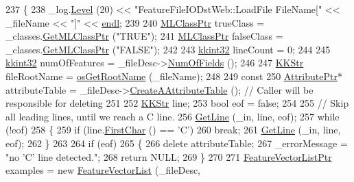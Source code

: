 \begin{DoxyCode}
237 \{
238   \_log.\hyperlink{class_k_k_b_1_1_run_log_a32cf761d7f2e747465fd80533fdbb659}{Level} (20) << \textcolor{stringliteral}{"FeatureFileIODstWeb::LoadFile   FileName["} << \_fileName << \textcolor{stringliteral}{"]"} << 
      \hyperlink{namespace_k_k_b_ad1f50f65af6adc8fa9e6f62d007818a8}{endl};
239 
240   \hyperlink{class_k_k_m_l_l_1_1_m_l_class}{MLClassPtr}  trueClass  = \_classes.\hyperlink{class_k_k_m_l_l_1_1_m_l_class_list_ab751a744d6e0d8937ca64b9cdde1488b}{GetMLClassPtr} (\textcolor{stringliteral}{"TRUE"});
241   \hyperlink{class_k_k_m_l_l_1_1_m_l_class}{MLClassPtr}  falseClass = \_classes.\hyperlink{class_k_k_m_l_l_1_1_m_l_class_list_ab751a744d6e0d8937ca64b9cdde1488b}{GetMLClassPtr} (\textcolor{stringliteral}{"FALSE"});
242 
243   \hyperlink{namespace_k_k_b_a8fa4952cc84fda1de4bec1fbdd8d5b1b}{kkint32}  lineCount = 0;
244 
245   \hyperlink{namespace_k_k_b_a8fa4952cc84fda1de4bec1fbdd8d5b1b}{kkint32}  numOfFeatures = \_fileDesc->\hyperlink{class_k_k_m_l_l_1_1_file_desc_a07abdfb77949dee565c555c7651581c2}{NumOfFields} ();
246 
247   \hyperlink{class_k_k_b_1_1_k_k_str}{KKStr} fileRootName = \hyperlink{namespace_k_k_b_af5b668ed9902d7f93b62529664a739f0}{osGetRootName} (\_fileName);
248 
249   \textcolor{keyword}{const}
250     \hyperlink{class_k_k_m_l_l_1_1_attribute}{AttributePtr}*  attributeTable = \_fileDesc->\hyperlink{class_k_k_m_l_l_1_1_file_desc_ab06cc9c9bd6ef17e487d5760ab4ff5f7}{CreateAAttributeTable} ();  \textcolor{comment}{
      // Caller will be responsible for deleting}
251 
252   \hyperlink{class_k_k_b_1_1_k_k_str}{KKStr}  line;
253   \textcolor{keywordtype}{bool}   eof = \textcolor{keyword}{false};
254 
255   \textcolor{comment}{// Skip all leading lines, until we reach a C line.}
256   \hyperlink{class_k_k_m_l_l_1_1_feature_file_i_o_a61ca11485d2c14368c1019bfcc53ab16}{GetLine} (\_in, line, eof);
257   \textcolor{keywordflow}{while}  (!eof)
258   \{
259     \textcolor{keywordflow}{if}  (line.\hyperlink{class_k_k_b_1_1_k_k_str_ac20e69c629b985c6569af914d9cc3e8c}{FirstChar} () == \textcolor{charliteral}{'C'})
260       \textcolor{keywordflow}{break};
261     \hyperlink{class_k_k_m_l_l_1_1_feature_file_i_o_a61ca11485d2c14368c1019bfcc53ab16}{GetLine} (\_in, line, eof);
262   \}
263 
264   \textcolor{keywordflow}{if}  (eof)
265   \{
266     \textcolor{keyword}{delete}  attributeTable;
267     \_errorMessage = \textcolor{stringliteral}{"no 'C' line detected."};
268     \textcolor{keywordflow}{return}  NULL;
269   \}
270 
271   \hyperlink{class_k_k_m_l_l_1_1_feature_vector_list}{FeatureVectorListPtr}  examples = \textcolor{keyword}{new} \hyperlink{class_k_k_m_l_l_1_1_feature_vector_list}{FeatureVectorList} (\_fileDesc, \textcolor{keyword}{
}
\end{DoxyCode}
